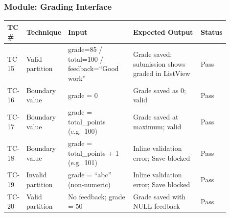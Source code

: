 \documentclass[12pt, a4paper]{article}
\begin{document}
\subsubsection*{Module: Grading Interface}
\begin{center}\small
\begin{tabular}{@{}p{0.06\linewidth}p{0.13\linewidth}p{0.30\linewidth}p{0.33\linewidth}p{0.08\linewidth}@{}}
  \toprule
  \textbf{TC \#} & \textbf{Technique} & \textbf{Input} & \textbf{Expected Output} & \textbf{Status} \\
  \midrule
  TC-15 & Valid partition & grade=85 / total=100 / feedback=``Good work'' & Grade saved; submission shows graded in ListView & \textcolor{success}{Pass} \\
  TC-16 & Boundary value  & grade = 0                                     & Grade saved as 0; valid                           & \textcolor{success}{Pass} \\
  TC-17 & Boundary value  & grade = total\_points (e.g.\ 100)             & Grade saved at maximum; valid                     & \textcolor{success}{Pass} \\
  TC-18 & Boundary value  & grade = total\_points + 1 (e.g.\ 101)         & Inline validation error; Save blocked             & \textcolor{success}{Pass} \\
  TC-19 & Invalid partition & grade = ``abc'' (non-numeric)               & Inline validation error; Save blocked             & \textcolor{success}{Pass} \\
  TC-20 & Valid partition & No feedback; grade = 50                       & Grade saved with NULL feedback                    & \textcolor{success}{Pass} \\
  \bottomrule
\end{tabular}
\end{center}
\end{document}
